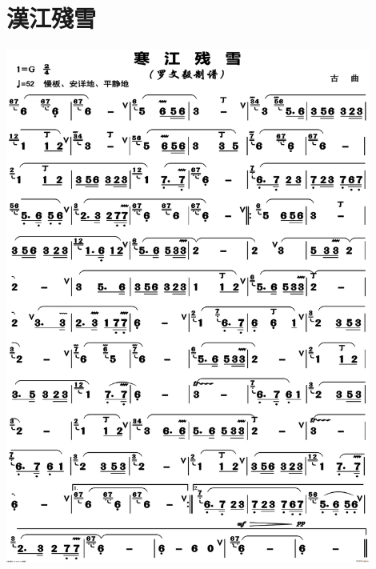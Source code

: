 \documentclass[cn,pad,twocol]{elegantbook}
\begin{document}
\section{漢江殘雪}  \includegraphics[width=0.9\textwidth]{dongxiao/20201231-汉江残雪} 
\end{document}
